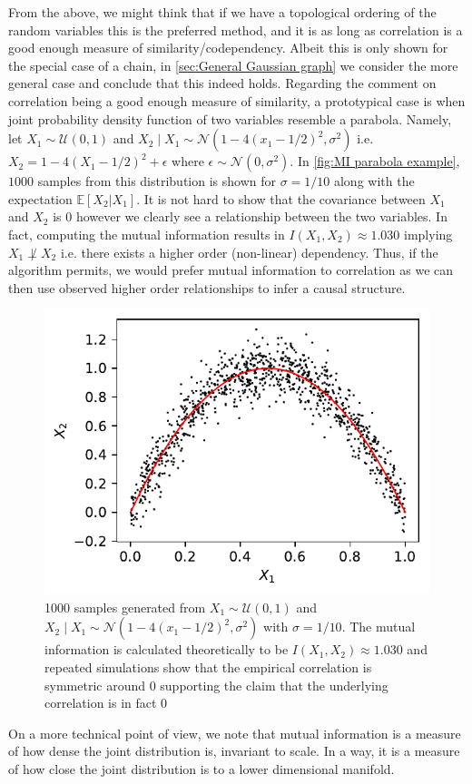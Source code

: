 \documentclass[../Thesis.tex]{subfiles}
\begin{document}
From the above, we might think that if we have a topological ordering of the random variables this is the preferred method, and it is as long as correlation is a good enough measure of similarity/codependency. Albeit this is only shown for the special case of a chain, in \autoref{sec:General Gaussian graph} we consider the more general case and conclude that this indeed holds. Regarding the comment on correlation being a good enough measure of similarity, a prototypical case is when joint probability density function of two variables resemble a parabola. Namely, let $X_1\sim \mathcal{U}\left(0,1\right)$ and $X_2 \mid X_1 \sim \mathcal{N}\left(1 - 4\left(x_1 - 1/2\right)^2 , \sigma^2\right)$ i.e. $X_2 = 1 - 4 \left(X_1 - 1/2\right)^2 + \epsilon$ where $\epsilon \sim \mathcal{N}\left(0,\sigma^2\right)$. In \autoref{fig:MI parabola example}, $1000$ samples from this distribution is shown for $\sigma = 1/10$ along with the expectation $\mathbb{E}\left[X_2 | X_1\right]$. It is not hard to show that the covariance between $X_1$ and $X_2$ is $0$ however we clearly see a relationship between the two variables. In fact, computing the mutual information results in $I\left(X_1,X_2\right) \approx 1.030$ implying $X_1 \not\perp X_2$ i.e. there exists a higher order (non-linear) dependency. Thus, if the algorithm permits, we would prefer mutual information to correlation as we can then use observed higher order relationships to infer a causal structure.
\begin{figure}[ht]
    \centering
    \includegraphics[width=.55\linewidth]{figures/Mutual information figures/parabola example.pdf}
    \caption{1000 samples generated from $X_1\sim \mathcal{U}\left(0,1\right)$ and $X_2 \mid X_1 \sim \mathcal{N}\left(1 - 4\left(x_1 - 1/2\right)^2 , \sigma^2\right)$ with $\sigma = 1/10$. The mutual information is calculated theoretically to be $I\left(X_1,X_2\right) \approx 1.030$ and repeated simulations show that the empirical correlation is symmetric around $0$ supporting the claim that the underlying correlation is in fact $0$} %
    \label{fig:MI parabola example}
\end{figure}
On a more technical point of view, we note that mutual information is a measure of how dense the joint distribution is, invariant to scale. In a way, it is a measure of how close the joint distribution is to a lower dimensional manifold.
\end{document}
